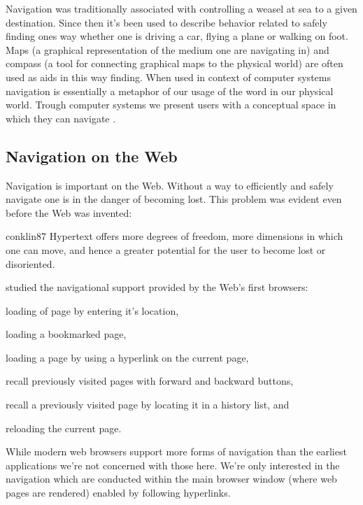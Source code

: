 Navigation was traditionally associated with controlling a weasel at sea to
a given destination.%
Since then it's been used to describe behavior related to safely finding ones
way whether one is driving a car, flying a plane or walking on foot. Maps
(a graphical representation of the medium one are navigating in)
and compass (a tool for connecting graphical maps to the physical world)
are often used as aids in this way finding. When used in context of
computer systems navigation is essentially a metaphor of our usage of the
word in our physical world. Trough computer systems we present users with a
conceptual space in which they can navigate \citep[p.~189]{whiteside85}.

\subsection{Navigation on the Web}

Navigation is important on the Web. Without a way to efficiently and safely
navigate one is in the danger of becoming lost. This problem was evident even
before the Web was invented:
\begin{citequote}[p.~38]{conklin87}
  Hypertext offers more degrees of freedom, more dimensions in which one
  can move, and hence a greater potential for the user
  to become lost or disoriented.
\end{citequote}

\citet{jones96} studied the navigational support provided by the Web's first
browsers:
\begin{inparaenum}[(i)]
  \item loading of page by entering it's location,
  \item loading a bookmarked page,
  \item loading a page by using a hyperlink on the current page,
  \item recall previously visited pages with forward and backward buttons,
  \item recall a previously visited page by locating it in a history list, and
  \item reloading the current page.
\end{inparaenum}
While modern web browsers support more forms of navigation%
than the earliest applications we're not concerned with those here.
We're only interested in the navigation which are conducted within the main
browser window (where web pages are rendered) enabled by following hyperlinks.

